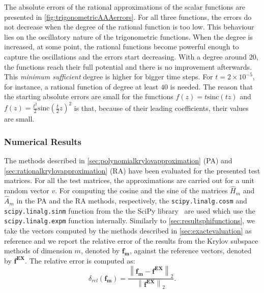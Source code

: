 The absolute errors of the rational approximations of the scalar functions are presented in
\autoref{fig:trigonometricAAAerrors}.
For all three functions, the errors do not decrease when the degree of the rational function is too low.
This behaviour lies on the oscillatory nature of the trigonometric functions. When the degree is increased,
at some point, the rational functions become powerful enough to capture the oscillations and the errors
start decreasing. With a degree around $20$, the functions reach their full potential and there is no
improvement afterwards. This \textit{minimum sufficient} degree is higher for bigger time steps.
For $t = 2 \times 10^{-5}$, for instance, a rational function of degree at least $40$ is needed.
The reason that the starting absolute errors are small for the functions
$f(z)=t \mathrm{sinc}(tz)$ and $f(z)=\frac{t^2}{2} \mathrm{sinc}(\frac{t}{2}z)^2$
is that, because of their leading coefficients, their values are small.

\FloatBarrier

\subsubsection*{Numerical Results}

The methods described in \autoref{sec:polynomialkrylovapproximation} (PA)
and \autoref{sec:rationalkrylovapproximation} (RA) have been evaluated for the presented test matrices.
For all the test matrices, the approximations are carried out for a unit random vector $v$.
For computing the cosine and the sine of the matrices $\hat{H}_m$ and $\hat{A}_m$ in the PA and the
RA methods, respectively, the \texttt{scipy.linalg.cosm} and \texttt{scipy.linalg.sinm} function
from the the SciPy library~\cite{SciPy2020} are used which use the \texttt{scipy.linalg.expm}
function internally.
Similarly to \autoref{sec:resultsphifunctions}, we take the vectors computed by the methods
described in \autoref{sec:exactevaluation} as reference and we report the relative
error of the results from the Krylov subspace methods of dimension $m$, denoted by
$\mathbf{f_m}$, against the reference vectors, denoted by $\mathbf{f^{EX}}$.
The relative error is computed as:
\begin{equation*}
    \delta_{rel}(\mathbf{f_m}) =
    \frac{\left\| \mathbf{f_m} - \mathbf{f^{EX}} \right\|_2}
    {\left\| \mathbf{f^{EX}} \right\|_2}.
\end{equation*}

